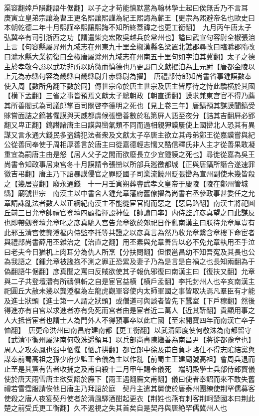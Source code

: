 渠容翻婞戶隕翻語牛倨翻】以子之才苟能慎默當為翰林學士起曰俟無舌乃不言耳　庚寅立皇弟宗讓為曹王更名熙讓熙謹為紀王熙誨為蘄王【更宗為熙避帝名也歐史曰本朝乾德二年十月熙謹卒熙讓熙誨不知所終蓋諱之也更工衡翻】　九月丙午唐太子弘冀卒有司引浙西之功【謂遣柴克宏敗吳越兵於常州也】謚曰武宣句容尉全椒張洎上言【句容縣屬昇州九域志在州東九十里全椒漢縣名梁置北譙郡尋改曰臨滁郡隋改曰滁水縣大業初復曰全椒唐屬滁州九域志在州南五十里句如字洎其冀翻】太子之德主於孝敬今謚以武功非所以防微而慎德也乃更謚曰文獻擢洎為上元尉【唐都金陵以上元為赤縣句容為畿縣自畿縣尉升赤縣尉為擢】　唐禮部侍郎知尚書省事鍾謨數奉使入周【數所角翻下數於同】傳世宗命於唐主世宗及唐主皆厚待之恃此驕横於其國【横下孟翻】三省之事皆預焉文獻太子總朝政【朝直遥翻】謨求兼東宫官不得乃薦其所善閻式為司議郎掌百司關啓李德明之死也【見上卷三年】唐鎬預其謀謨聞鎬受賕嘗面詰之鎬甚懼謨與天威都虞候張巒善數於私第屛人語至夜分【詰其吉翻屛必郢翻又卑正翻】鎬譖諸唐主曰謨與巒氣類不同而過相親狎謨屢使上國巒北人恐其有異謀又言永通大錢民多盗鑄犯法者衆及文獻太子卒唐主欲立其母弟鄭王從嘉謨嘗與紀公從善同奉使于周相厚善言於唐主曰從嘉德輕志懦又酷信釋氏非人主才從善果敢凝重宜為嗣唐主由是怒【居人父子之間而欲廢長立少宜鍾謨之死也】尋徙從嘉為吳王尚書令知政事居東宫冬十月謨請令張巒以所部兵廵徼都城【正與唐鎬所譖合遂速罪徼吉弔翻】唐主乃下詔暴謨侵官之罪貶國子司業流饒州貶張巒為宣州副使未幾皆殺之【幾居豈翻】廢永通錢　十一月壬寅朔葬睿武孝文皇帝于慶陵【陵在鄭州管城縣】廟號世宗　南漢主以中書舍人鍾允章藩府舊僚擢為尚書右丞參政事甚委任之允章請誅亂法者數人以正綱紀南漢主不能從宦官聞而惡之【惡烏路翻】南漢主將祀圓丘前三日允章帥禮官登壇四顧指揮設神位【帥讀曰率】内侍監許彦真望之曰此謀反也即帶劔登壇允章叱之彦真馳入宫告允章欲於郊祀日作亂南漢主曰朕待允章厚豈有此邪玉清宫使龔澄樞内侍監李托等共證之以彦真言為然乃收允章繫含章樓下命宦者與禮部尚書薛用丕雜治之【治直之翻】用丕素與允章善告以必不免允章執用丕手泣曰老夫今日猶机上肉耳分為仇人所烹【分扶問翻】但恨邕昌幼不知吾寃及其長也公為我語之【鍾允章被讒抱不測之罪正恐累及妻子乃為是言是自禍之也長知兩翻為于偽翻語牛倨翻】彦真聞之罵曰反賊欲使其子報仇邪復曰南漢主曰【復扶又翻】允章與二子共登壇濳有所禱俱斬之自是宦官益横【横戶孟翻】李托封州人也辛亥南漢主祀圓丘大赦未幾以龔澄樞為左龍虎觀軍容使内太師軍國之事皆取决焉凡羣臣有才能及進士狀頭【進士第一人謂之狀頭】或僧道可與談者皆先下蠶室【下戶稼翻】然後得進亦有自宫以求進者亦有免死而宫者由是宦者近二萬人【近其靳翻】貴顯用事之人大抵皆宦者也謂士人為門外人不得預事卒以此亡國【至宋開寶四年而南漢亡卒子恤翻】　唐更命洪州曰南昌府建南都【更工衡翻】以武清節度使何敬洙為南都留守【武清軍衡州屬湖南何敬洙遥領耳】以兵部尚書陳繼善為南昌尹【將徙都豫章也】　周人之攻秦鳳也蜀中忷懼【忷許拱翻】都官郎中徐及甫自負才略仕不得志隂結黨與謀奉前蜀高祖之孫少府少監王令儀為主以作亂【前蜀主王建廟號高祖】會周兵退而止至是其黨有告者收捕之及甫自殺十二月甲午賜令儀死　端明殿學士兵部侍郎竇儀使於唐天雨雪唐主欲受詔於廡下【雨王遇翻廡文甫翻】儀曰使者奉詔而來不敢失舊禮若雪霑服請俟他日唐主乃拜詔於庭　契丹主遣其舅使於唐泰州團練使荆罕儒募客使殺之唐人夜宴契丹使者於清風驛酒酣起更衣【荆姓也燕有刺客荆軻楚國本曰荆此楚之前受氏更工衡翻】久不返視之失其首矣自是契丹與唐絶罕儒冀州人也

